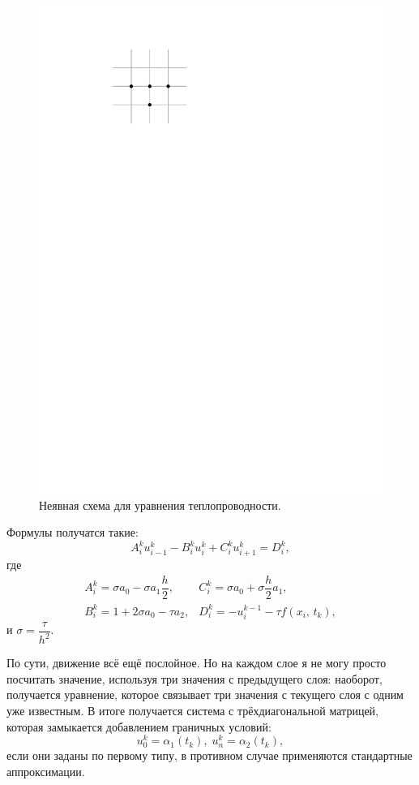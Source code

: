 \documentclass{trlnotes}
\begin{document}
\begin{figure}[h] \label{fig:therm-implicit}
	\begin{center}
		\includegraphics[scale=0.9]{../img/pde/therm-implicit.pdf}
	\end{center}
	\caption{Неявная схема для уравнения теплопроводности.}
\end{figure}

Формулы получатся такие:
\[
	A_i^k u_{i-1}^k - B_i^k u_i^k + C_i^k u_{i+1}^k = D_i^k,
\]
где
\[
	\begin{array}{ll}
		A_i^k = \sigma a_0 - \sigma a_1 \dfrac{h}{2}, & C_i^k = \sigma a_0 + \sigma \dfrac{h}{2} a_1, \\
		B_i^k = 1 + 2 \sigma a_0 - \tau a_2,  &D_i^k = -u_i^{k-1} - \tau f(x_i, \, t_k),
	\end{array}
\]
и $\sigma = \dfrac{\tau}{h^2}$.

По сути, движение всё ещё послойное. Но на каждом слое я не могу просто посчитать значение, используя три значения с предыдущего слоя: наоборот, получается уравнение, которое связывает три значения с текущего слоя с одним уже известным. В итоге получается система с трёхдиагональной матрицей, которая замыкается добавлением граничных условий:
\[
	u_0^k = \alpha_1(t_k), \; u_n^k = \alpha_2(t_k),
\]
если они заданы по первому типу, в противном случае применяются стандартные аппроксимации. 
\end{document}
